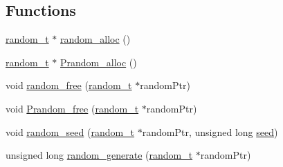 \subsection*{Functions}
\begin{DoxyCompactItemize}
\item 
\hyperlink{rstm_2rstm-dev_2stamp-0_89_810_2lib_2random_8h_af410e652a1bc8f802b0da971e8b87fad}{random\-\_\-t} $\ast$ \hyperlink{rstm_2rstm-dev_2stamp-0_89_810_2lib_2random_8h_a1c12ae35ed77284746df3ffd887ae119}{random\-\_\-alloc} ()
\item 
\hyperlink{rstm_2rstm-dev_2stamp-0_89_810_2lib_2random_8h_af410e652a1bc8f802b0da971e8b87fad}{random\-\_\-t} $\ast$ \hyperlink{rstm_2rstm-dev_2stamp-0_89_810_2lib_2random_8h_a23ba58fb29a27e4f5801b2be7b93f0d1}{Prandom\-\_\-alloc} ()
\item 
void \hyperlink{rstm_2rstm-dev_2stamp-0_89_810_2lib_2random_8h_a0c229220c85a7223d42ab697628d1f95}{random\-\_\-free} (\hyperlink{rstm_2rstm-dev_2stamp-0_89_810_2lib_2random_8h_af410e652a1bc8f802b0da971e8b87fad}{random\-\_\-t} $\ast$random\-Ptr)
\item 
void \hyperlink{rstm_2rstm-dev_2stamp-0_89_810_2lib_2random_8h_a64d899bb4c137344353c4e0d17bbc61f}{Prandom\-\_\-free} (\hyperlink{rstm_2rstm-dev_2stamp-0_89_810_2lib_2random_8h_af410e652a1bc8f802b0da971e8b87fad}{random\-\_\-t} $\ast$random\-Ptr)
\item 
void \hyperlink{rstm_2rstm-dev_2stamp-0_89_810_2lib_2random_8h_a4863f841babe7ce3664a4e4bed6180ab}{random\-\_\-seed} (\hyperlink{rstm_2rstm-dev_2stamp-0_89_810_2lib_2random_8h_af410e652a1bc8f802b0da971e8b87fad}{random\-\_\-t} $\ast$random\-Ptr, unsigned long \hyperlink{mesh_8cpp_a1447ad288a0a73454510f5777bdc3ed1}{seed})
\item 
unsigned long \hyperlink{rstm_2rstm-dev_2stamp-0_89_810_2lib_2random_8h_a733bbcfd7d850fa4596d834489b83178}{random\-\_\-generate} (\hyperlink{rstm_2rstm-dev_2stamp-0_89_810_2lib_2random_8h_af410e652a1bc8f802b0da971e8b87fad}{random\-\_\-t} $\ast$random\-Ptr)
\end{DoxyCompactItemize}


